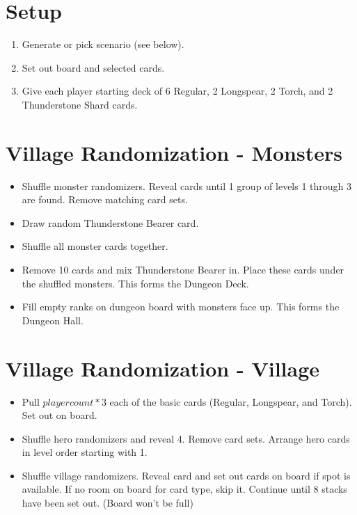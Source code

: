 \documentclass[12pt]{article}
\newenvironment{enumerateCustom}
{\begin{enumerate}
  \setlength{\itemsep}{1pt}
  \setlength{\parskip}{0pt}
  \setlength{\parsep}{0pt}}
{\end{enumerate}}
\newenvironment{itemizeCustom}
{\begin{itemize}
  \setlength{\itemsep}{1pt}
  \setlength{\parskip}{0pt}
  \setlength{\parsep}{0pt}}
{\end{itemize}}
\begin{document}
\begin{mdframed}[style = customFrame]
\begin{multicols*}{2}

\section*{Setup}
\begin{enumerateCustom}
	\item Generate or pick scenario (see below). 
	\item Set out board and selected cards.
	\item Give each player starting deck of 6 Regular, 2 Longspear, 2 Torch, and 2 Thunderstone Shard cards.
\end{enumerateCustom}

\section*{Village Randomization - Monsters}
\begin{itemizeCustom}
	\item Shuffle monster randomizers. Reveal cards until 1 group of levels 1 through 3 are found. Remove matching card sets.
	\item Draw random Thunderstone Bearer card.
	\item Shuffle all monster cards together.
	\item Remove 10 cards and mix Thunderstone Bearer in. Place these cards under the shuffled monsters. This forms the Dungeon Deck.
	\item Fill empty ranks on dungeon board with monsters face up. This forms the Dungeon Hall.
\end{itemizeCustom}

\section*{Village Randomization - Village}
\begin{itemizeCustom}
	\item Pull $player count * 3$ each of the basic cards (Regular, Longspear, and Torch). Set out on board.
	\item Shuffle hero randomizers and reveal 4. Remove card sets. Arrange hero cards in level order starting with 1.
	\item Shuffle village randomizers. Reveal card and set out cards on board if spot is available. If no room on board for card type, skip it. Continue until 8 stacks have been set out. (Board won't be full)
\end{itemizeCustom}


\end{multicols*}
\end{mdframed}
\end{document}
